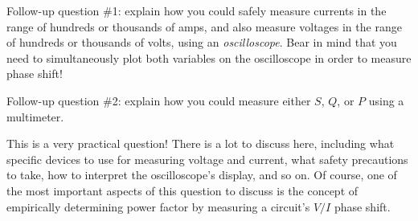 \vskip 10pt

Follow-up question \#1: explain how you could safely measure currents in the range of hundreds or thousands of amps, and also measure voltages in the range of hundreds or thousands of volts, using an {\it oscilloscope}.  Bear in mind that you need to simultaneously plot both variables on the oscilloscope in order to measure phase shift!

\vskip 10pt

Follow-up question \#2: explain how you could measure either $S$, $Q$, or $P$ using a multimeter.







This is a very practical question!  There is a lot to discuss here, including what specific devices to use for measuring voltage and current, what safety precautions to take, how to interpret the oscilloscope's display, and so on.  Of course, one of the most important aspects of this question to discuss is the concept of empirically determining power factor by measuring a circuit's $V/I$ phase shift.




